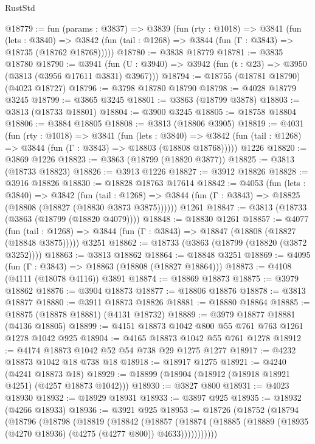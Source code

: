 \begin{lexlean}{RustStd}
\begin{coremodule}
{\begin{coremodule}
{{{{{{{{{{{{{{{{{{{{{{{{{{{{{{{{{{{@18779 := fun (params : @3837) =>
  @3839
    (fun (rty : @1018) =>
    @3841
      (fun (lets : @3840) =>
      @3842 (fun (tail : @1268) => @3844 (fun (Γ : @3843) => @18735 (@18762 @18768)))))
@18780 := @3838 @18779
@18781 := @3835 @18780
@18790 := @3941
    (fun (U : @3940) => @3942 (fun (t : @23) => @3950 (@3813 (@3956 @17611 @3831) @3967)))
@18794 := @18755 (@18781 @18790) (@4023 @18727)
@18796 := @3798 @18780 @18790
@18798 := @4028 @18779 @3245
@18799 := @3865 @3245
@18801 := @3863 (@18799 @3878)
@18803 := @3813 (@18733 @18801)
@18804 := @3900 @3245
@18805 := @18758 @18804
@18806 := @3884 @18805
@18808 := @3813 (@18806 @3905)
@18819 := @4031
    (fun (rty : @1018) =>
    @3841
      (fun (lets : @3840) =>
      @3842 (fun (tail : @1268) => @3844 (fun (Γ : @3843) => @18803 (@18808 @18768)))))
    @1226
@18820 := @3869 @1226
@18823 := @3863 (@18799 (@18820 @3877))
@18825 := @3813 (@18733 @18823)
@18826 := @3913 @1226
@18827 := @3912 @18826
@18828 := @3916 @18826
@18830 := @18828 @18763 @17614
@18842 := @4053
    (fun (lets : @3840) =>
    @3842
      (fun (tail : @1268) =>
      @3844 (fun (Γ : @3843) => @18825 (@18808 (@18827 (@18830 @3873 @3875))))))
    @1261
@18847 := @3813 (@18733 (@3863 (@18799 (@18820 @4079))))
@18848 := @18830 @1261
@18857 := @4077
    (fun (tail : @1268) => @3844 (fun (Γ : @3843) => @18847 (@18808 (@18827 (@18848 @3875)))))
    @3251
@18862 := @18733 (@3863 (@18799 (@18820 (@3872 @3252))))
@18863 := @3813 @18862
@18864 := @18848 @3251
@18869 := @4095 (fun (Γ : @3843) => @18863 (@18808 (@18827 @18864)))
@18873 := @4108 (@4111 (@18078 @4116)) @3891
@18874 := @18869 @18873
@18875 := @3979 @18862
@18876 := @3904 @18873
@18877 := @18806 @18876
@18878 := @3813 @18877
@18880 := @3911 @18873 @18826
@18881 := @18880 @18864
@18885 := @18875 (@18878 @18881) (@4131 @18732)
@18889 := @3979 @18877 @18881 (@4136 @18805)
@18899 := @4151 @18873 @1042 @800 @55 @761 @763 @1261 @1278 @1042 @925
@18904 := @4165 @18873 @1042 @55 @761 @1278
@18912 := @4174 @18873 @1042 @52 @54 @738 @29 @1275 @1277
@18917 := @4232 @18873 @1042 @18 @738 @18
@18918 := @18917 @1275
@18921 := @4240 (@4241 @18873 @18)
@18929 := @18899 (@18904 (@18912 (@18918 @18921 @4251) (@4257 @18873 @1042)))
@18930 := @3827 @800
@18931 := @4023 @18930
@18932 := @18929 @18931
@18933 := @3897 @925
@18935 := @18932 (@4266 @18933)
@18936 := @3921 @925
@18953 := @18726
    (@18752
      (@18794
        (@18796
          (@18798
            (@18819
              (@18842
                (@18857
                  (@18874
                    (@18885 (@18889 (@18935 (@4270 @18936) (@4275 (@4277 @800)) @4633)))))))))))
}}}}}}}}}}}}}}}}}}}}}}}}}}}}}}}}}}}
\end{coremodule}}
\end{coremodule}
\end{lexlean}
